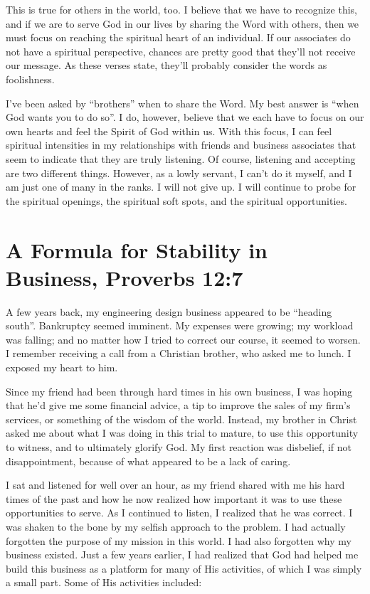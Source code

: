 \documentclass[12pt]{memoir}
\begin{document}
This is true for others in the world, too.
I believe that we have to recognize this, and if we are to serve God
in our lives by sharing the Word with others, then we must focus
on reaching the spiritual heart of an individual. If our associates
do not have a spiritual perspective, chances are pretty good that
they'll not receive our message. As these verses state, they'll probably
consider the words as foolishness. 

I've been asked by ``brothers'' when to share the Word. My best answer is ``when God wants you to do so''. I do, however, believe that we each have to focus on our own hearts and feel the
Spirit of God within us. With this focus, I can feel spiritual intensities in my relationships with friends and business associates
that seem to indicate that they are truly listening. Of course, listening
and accepting are two different things. However, as a lowly servant,
I can't do it myself, and I am just one of many in the ranks. I will
not give up. I will continue to probe for the spiritual openings,
the spiritual soft spots, and the spiritual opportunities.

\section[A Formula for Stability in Business]{A Formula for Stability in Business, Proverbs 12:7}

A few years back, my engineering design business appeared to be ``heading
south''. Bankruptcy seemed imminent. My expenses were growing; my
workload was falling; and no matter how I tried to correct our course,
it seemed to worsen. I remember receiving a call from a Christian
brother, who asked me to lunch. I exposed my heart to him. 

Since my friend had been through hard times in his own business, I
was hoping that he'd give me some financial advice, a tip to improve
the sales of my firm's services, or something of the wisdom of the world. Instead,
my brother in Christ asked me about what I was doing in this trial
to mature, to use this opportunity to witness, and to ultimately glorify
God. My first reaction was disbelief, if not disappointment, because
of what appeared to be a lack of caring. 

I sat and listened for well over an hour, as my friend shared with
me his hard times of the past and how he now realized how important
it was to use these opportunities to serve. As I continued to listen,
I realized that he was correct. I was shaken to the bone by my selfish
approach to the problem. I had actually forgotten the purpose of my
mission in this world. I had also forgotten why my business existed.
Just a few years earlier, I had realized that God had helped me build
this business as a platform for many of His activities, of which I
was simply a small part. Some of His activities included:
\end{document}
